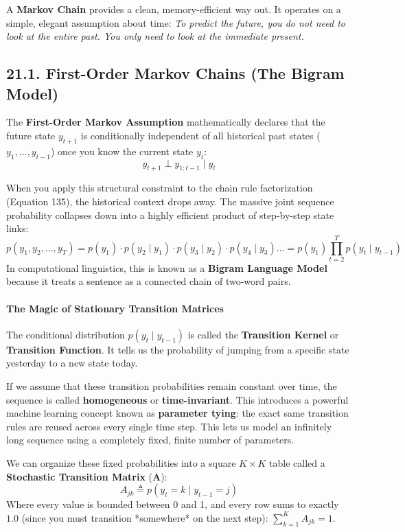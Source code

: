 \documentclass{article}
\begin{document}
A \textbf{Markov Chain} provides a clean, memory-efficient way out. It operates on a simple, elegant assumption about time: \textit{To predict the future, you do not need to look at the entire past. You only need to look at the immediate present.}

\subsection*{21.1. First-Order Markov Chains (The Bigram Model)}
The \textbf{First-Order Markov Assumption} mathematically declares that the future state $y_{t+1}$ is conditionally independent of all historical past states ($y_1, \dots, y_{t-1}$) once you know the current state $y_t$:
\begin{equation}
y_{t+1} \perp y_{1:t-1} \mid y_t \tag{136}
\end{equation}

When you apply this structural constraint to the chain rule factorization (Equation 135), the historical context drops away. The massive joint sequence probability collapses down into a highly efficient product of step-by-step state links:
\begin{equation}
p(y_1, y_2, \dots, y_T) = p(y_1) \cdot p(y_2 \mid y_1) \cdot p(y_3 \mid y_2) \cdot p(y_4 \mid y_3) \dots = p(y_1) \prod_{t=2}^T p(y_t \mid y_{t-1}) \tag{137}
\end{equation}
In computational linguistics, this is known as a \textbf{Bigram Language Model} because it treats a sentence as a connected chain of two-word pairs.

\paragraph{The Magic of Stationary Transition Matrices}
The conditional distribution $p(y_t \mid y_{t-1})$ is called the \textbf{Transition Kernel} or \textbf{Transition Function}. It tells us the probability of jumping from a specific state yesterday to a new state today.

If we assume that these transition probabilities remain constant over time, the sequence is called \textbf{homogeneous} or \textbf{time-invariant}. This introduces a powerful machine learning concept known as \textbf{parameter tying}: the exact same transition rules are reused across every single time step. This lets us model an infinitely long sequence using a completely fixed, finite number of parameters.

We can organize these fixed probabilities into a square $K \times K$ table called a \textbf{Stochastic Transition Matrix} ($\mathbf{A}$):
\begin{equation}
A_{jk} \triangleq p(y_t = k \mid y_{t-1} = j) \tag{138}
\end{equation}
Where every value is bounded between 0 and 1, and every row sums to exactly $1.0$ (since you must transition *somewhere* on the next step): $\sum_{k=1}^K A_{jk} = 1$.
\end{document}
